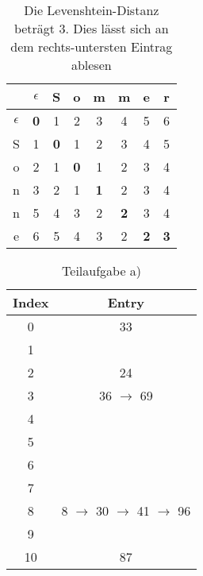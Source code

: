 \documentclass[12pt]{scrartcl}
\begin{document}

\exercise{}
\begin{table}[h!]
\begin{center}
\begin{tabular}{c|c|c|c|c|c|c|c}
& $\epsilon$ & S & o & m & m & e & r\\
\hline
$\epsilon$ & \textbf{0} & 1 & 2 & 3 & 4 & 5 & 6\\
\hline
S & 1 & \textbf{0} & 1 & 2 & 3 & 4 & 5\\
\hline
o & 2 & 1 & \textbf{0} & 1 & 2 & 3 & 4\\
\hline
n & 3 & 2 & 1 & \textbf{1} & 2 & 3 & 4\\
\hline
n & 5 & 4 & 3 & 2 & \textbf{2} & 3 & 4\\
\hline
e & 6 & 5 & 4 & 3 & 2 & \textbf{2} & \textbf{3}\\
\hline
\end{tabular}
\end{center}
\caption{Die Levenshtein-Distanz beträgt 3. Dies lässt sich an dem rechts-untersten Eintrag ablesen}
\end{table}

\exercise{}
\begin{table}[h!]
\begin{center}
\begin{tabular}{|c|c|}
\hline
Index & Entry\\
\hline
\hline
0 & 33\\
\hline
1 & \\
\hline
2 & 24 \\
\hline
3 & 36 $\rightarrow$ 69\\
\hline
4 & \\
\hline
5 & \\
\hline
6 & \\
\hline
7 & \\
\hline
8 & 8 $\rightarrow$ 30 $\rightarrow$ 41 $\rightarrow$ 96\\
\hline
9 & \\
\hline
10 & 87\\
\hline
\end{tabular}
\caption{Teilaufgabe a)}
\end{center}
\end{table}
\end{document}
